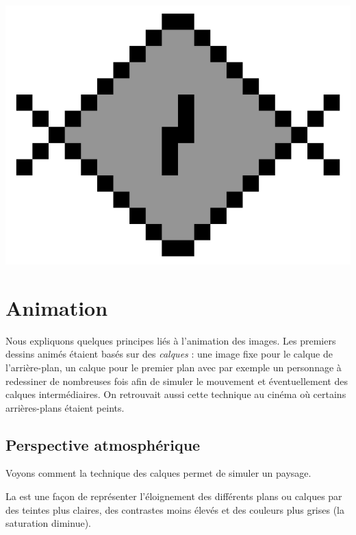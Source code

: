 \documentclass[11pt,class=report,crop=false]{standalone}
\begin{document}
\begin{center}
	\includegraphics[scale=\myscale,scale=0.20]{figures/fill02_077}
\end{center}

\section{Animation}


Nous expliquons quelques principes liés à l'animation des images.
Les premiers dessins animés étaient basés sur des \emph{calques} : une image fixe pour le calque de l'arrière-plan, un calque pour le premier plan avec par exemple un personnage à redessiner de nombreuses fois afin de simuler le mouvement et éventuellement des calques intermédiaires. On retrouvait aussi cette technique au cinéma où certains arrières-plans étaient peints. 


\subsection{Perspective atmosphérique}


Voyons comment la technique des calques permet de simuler un paysage.

La  est une façon de représenter l'éloignement des différents plans ou calques par des teintes plus claires, des contrastes moins élevés et des couleurs plus grises (la saturation diminue).
\end{document}
